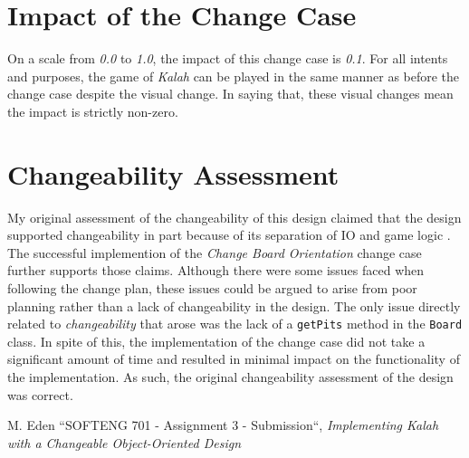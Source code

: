 \documentclass[10pt, a4paper, conference]{IEEEtran}
\begin{document}
\section{Impact of the Change Case}
On a scale from \textit{0.0} to \textit{1.0}, the impact of this change case is
\textit{0.1}. For all intents and purposes, the game of \textit{Kalah} can be
played in the same manner as before the change case despite the visual change.
In saying that, these visual changes mean the impact is strictly non-zero.

\section{Changeability Assessment}
My original assessment of the changeability of this design claimed that the
design supported changeability in part because of its separation of IO and game
logic \cite{a3-design}. The successful implemention of the \textit{Change Board
Orientation} change case further supports those claims. Although there were
some issues faced when following the change plan, these issues could be argued to
arise from poor planning rather than a lack of changeability in the design. The
only issue directly related to \textit{changeability} that arose was the lack
of a \texttt{getPits} method in the \texttt{Board} class. In spite of this,
the implementation of the change case did not take a significant
amount of time and resulted in minimal impact on the functionality of the
implementation. As such, the original changeability assessment of the design
was correct.

\begin{thebibliography}{00}
   M. Eden ``SOFTENG 701 - Assignment 3 - Submission``,
    \textit{Implementing Kalah with a Changeable Object-Oriented Design}
\end{thebibliography}
\end{document}
